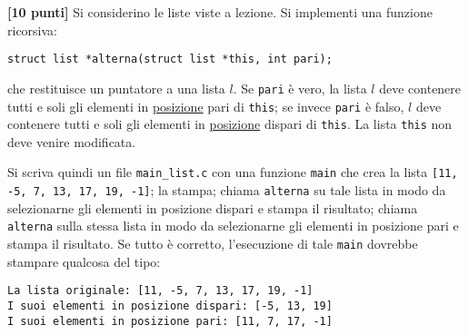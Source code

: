 \documentclass{article}[10pt]
\newcounter{esnu}
\newenvironment{esercizio}{\medskip \noindent {\bf Esercizio\addtocounter{esnu}{1} \arabic{esnu}}}{}
\begin{document}
\begin{esercizio}
\textbf{[10 punti]}
Si considerino le liste viste a lezione. Si implementi una funzione ricorsiva:
\begin{verbatim}
struct list *alterna(struct list *this, int pari);
\end{verbatim}
che restituisce un puntatore a una lista $l$. Se \texttt{pari} \`e vero, la lista $l$
deve contenere tutti e soli gli elementi in
\underline{posizione} pari di \texttt{this}; se invece \texttt{pari} \`e falso, $l$ deve contenere tutti e soli
gli elementi in \underline{posizione} dispari di \texttt{this}. La lista \texttt{this} non deve venire
modificata.

Si scriva quindi un file \texttt{main\_list.c} con una funzione \texttt{main} che crea la lista
\texttt{[11, -5, 7, 13, 17, 19, -1]}; la stampa; chiama \texttt{alterna} su tale lista in modo da selezionarne
gli elementi in posizione dispari e stampa il risultato; chiama \texttt{alterna} sulla stessa lista in modo
da selezionarne gli elementi in posizione pari e stampa il risultato. Se tutto \`e corretto, l'esecuzione
di tale \texttt{main} dovrebbe stampare qualcosa del tipo:
%
\begin{verbatim}
La lista originale: [11, -5, 7, 13, 17, 19, -1]
I suoi elementi in posizione dispari: [-5, 13, 19]
I suoi elementi in posizione pari: [11, 7, 17, -1]
\end{verbatim}
%
\end{esercizio}
%
\end{document}
